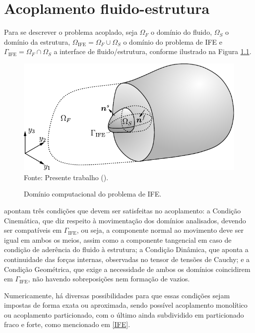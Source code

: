 \chapter{Acoplamento fluido-estrutura} \label{AFE}

Para se descrever o problema acoplado, seja $\Omega_F$ o domínio do fluido, $\Omega_S$ o domínio da estrutura, $\Omega_\mathrm{IFE}=\Omega_F\cup\Omega_S$ o domínio do problema de IFE e $\Gamma_\mathrm{IFE}=\Omega_F\cap\Omega_S$ a interface de fluido/estrutura, conforme ilustrado na Figura \ref{fig:DomComp}.

\begin{figure}[h!]
    \centering
    \caption{Domínio computacional do problema de IFE.}
    \includegraphics[width=.65\linewidth]{Figuras/Dom_Comp.pdf}
    \\Fonte: Presente trabalho (\the\year).
    \label{fig:DomComp}
\end{figure}

 apontam três condições que devem ser satisfeitas no acoplamento: a Condição Cinemática, que diz respeito à movimentação dos domínios analisados, devendo ser compatíveis em $\Gamma_\mathrm{IFE}$, ou seja, a componente normal ao movimento deve ser igual em ambos os meios, assim como a componente tangencial em caso de condição de aderência do fluido à estrutura; a Condição Dinâmica, que aponta a continuidade das forças internas, observadas no tensor de tensões de Cauchy; e a Condição Geométrica, que exige a necessidade de ambos os domínios coincidirem em $\Gamma_\mathrm{IFE}$, não havendo sobreposições nem formação de vazios.

Numericamente, há diversas possibilidades para que essas condições sejam impostas de forma exata ou aproximada, sendo possível acoplamento monolítico ou acoplamento particionado, com o último ainda subdividido em particionado fraco e forte, como mencionado em \ref{IFE}.

